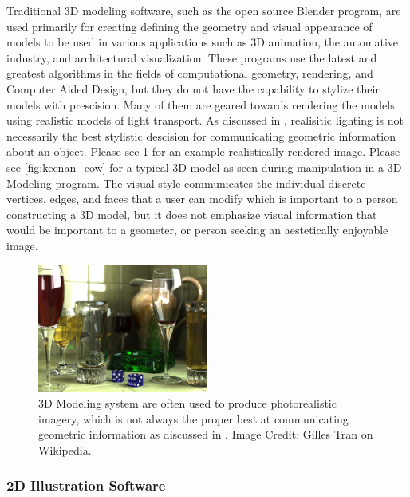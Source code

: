 \documentclass[12pt, letterpaper]{article}
\begin{document}
		Traditional 3D modeling software, such as the open source Blender program, are used primarily for creating defining the geometry and visual appearance of models to be 
		used in various applications such as 3D animation, the automative industry, and architectural visualization.
		These programs use the latest and greatest algorithms in the fields of computational geometry, rendering, and Computer Aided Design,
		but they do not have the capability to stylize their models with prescision. Many of them are geared towards rendering the models using 
		realistic models of light transport. As discussed in \cite{JDA08}, realisitic lighting is not necessarily the best stylistic descision for communicating
		geometric information about an object. Please see \ref{fig:photorealistic_rendering} for an example realistically rendered image.
		Please see \ref{fig:keenan_cow} for a typical 3D model as seen during manipulation in a 3D Modeling program. The visual style communicates
		the individual discrete vertices, edges, and faces that a user can modify which is important to a person constructing a 3D model, but it does not
		emphasize visual information that would be important to a geometer, or person seeking an aestetically enjoyable image.

		\begin{figure}[h]
		\centering
		\includegraphics[width=0.5\textwidth]{PhotorealisticRendering}
		\caption{3D Modeling system are often used to produce photorealistic imagery, which is not always the proper best at communicating geometric information as discussed in \cite{JDA08}.
				Image Credit: Gilles Tran on Wikipedia.}
		\label{fig:photorealistic_rendering}
		\end{figure}

		\subsubsection{2D Illustration Software}
\end{document}
